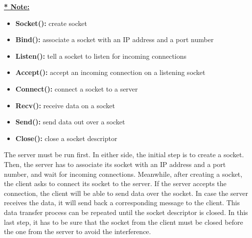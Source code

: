 \newpage
\underline{\textbf{* Note: }}
\begin{itemize}
    \item \textbf{Socket(): }create socket
    \item \textbf{Bind(): }  associate a socket with an IP address and a port number
    \item \textbf{Listen(): } tell a socket to listen for incoming connections
    \item \textbf{Accept(): } accept an incoming connection on a listening socket
    \item \textbf{Connect(): }connect a socket to a server
    \item \textbf{Recv():}  receive data on a socket
    \item \textbf{Send(): }send data out over a socket
    \item \textbf{Close(): }close a socket descriptor
\end{itemize}

\hspace{0.7cm}The server must be run first. In either side, the initial step is to create a socket. Then, the server has to associate its socket with an IP address and a port number, and wait for incoming connections. Meanwhile, after creating a socket, the client asks to connect its socket to the server. If the server accepts the connection, the client will be able to send data over the socket. In case the server receives the data, it will send back a corresponding message to the client. This data transfer process can be repeated until the socket descriptor is closed. In this last step, it has to be sure that the socket from the client must be closed before the one from the server to avoid the interference.
